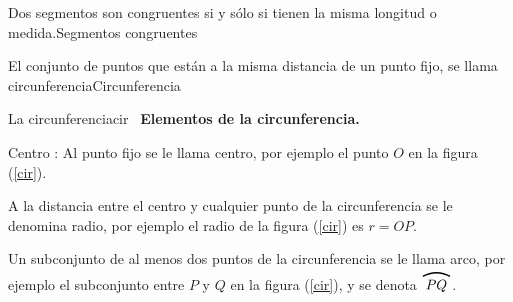 \documentclass[12pt]{book}
\begin{document}
\begin{definicion}{Dos segmentos son congruentes si y sólo si tienen la misma
longitud o medida.}{Segmentos congruentes}
\end{definicion}
\begin{definicion}{El conjunto de puntos que est\'{a}n a la misma distancia de un punto fijo,
se llama circunferencia}{Circunferencia}
 \begin{figura}{
}{La circunferencia}{cir}
\nota \, \textbf{Elementos de la circunferencia. }
\begin{lista}
\item Centro : Al punto fijo se le llama centro, por ejemplo el punto $O$ en la figura (\ref{cir}).

\item A la distancia entre el centro y  cualquier punto de la
circunferencia se le denomina radio, por ejemplo el radio de la figura (\ref{cir}) es $r=OP$.

\item Un subconjunto de al menos dos puntos de la circunferencia se le llama
arco, por ejemplo el subconjunto entre $P$ y $Q$ en la figura (\ref{cir}), y se denota $\arco[20pt]{PQ}$.
\end{lista}
   \end{figura}
\end{definicion}
\end{document}
